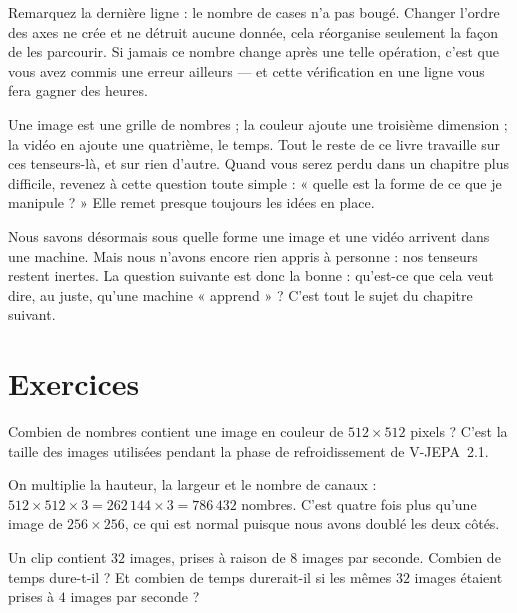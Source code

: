 \begin{piege}
Remarquez la dernière ligne : le nombre de cases n'a pas bougé. Changer
l'ordre des axes ne crée et ne détruit aucune donnée, cela réorganise
seulement la façon de les parcourir. Si jamais ce nombre change après une
telle opération, c'est que vous avez commis une erreur ailleurs — et cette
vérification en une ligne vous fera gagner des heures.
\end{piege}

\begin{aretenir}
Une image est une grille de nombres ; la couleur ajoute une troisième
dimension ; la vidéo en ajoute une quatrième, le temps. Tout le reste de ce
livre travaille sur ces tenseurs-là, et sur rien d'autre. Quand vous serez
perdu dans un chapitre plus difficile, revenez à cette question toute
simple : « quelle est la forme de ce que je manipule ? » Elle remet presque
toujours les idées en place.
\end{aretenir}

Nous savons désormais sous quelle forme une image et une vidéo arrivent
dans une machine. Mais nous n'avons encore rien appris à personne : nos
tenseurs restent inertes. La question suivante est donc la bonne :
qu'est-ce que cela veut dire, au juste, qu'une machine « apprend » ? C'est
tout le sujet du chapitre suivant.

\section*{Exercices}

\begin{exercice}
Combien de nombres contient une image en couleur de $512 \times 512$
pixels ? C'est la taille des images utilisées pendant la phase de
refroidissement de V-JEPA~2.1.
\end{exercice}

\begin{solution}
On multiplie la hauteur, la largeur et le nombre de canaux :
$512 \times 512 \times 3 = 262\,144 \times 3 = 786\,432$ nombres. C'est
quatre fois plus qu'une image de $256 \times 256$, ce qui est normal
puisque nous avons doublé les deux côtés.
\end{solution}

\begin{exercice}
Un clip contient $32$ images, prises à raison de $8$ images par seconde.
Combien de temps dure-t-il ? Et combien de temps durerait-il si les mêmes
$32$ images étaient prises à $4$ images par seconde ?
\end{exercice}

